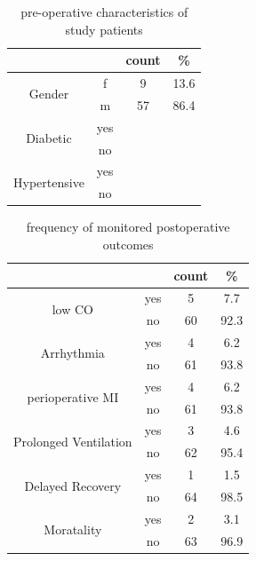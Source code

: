\documentclass[14pt,a4paper,onecolumn]{extarticle}
\begin{document}
\begin{table}[]
\centering
\caption{pre-operative characteristics of study patients}
\label{Preop_characteristics}
    \begin{tabular}{cccc}
    \hline
                                           &     & count & \%   \\ \hline

    \multirow{2}{*}{Gender}                & f   & 9     & 13.6 \\
                                           & m   & 57    & 86.4 \\
    \multirow{2}{*}{Diabetic}              & yes &       &      \\
                                           & no  &       &      \\
    \multirow{2}{*}{Hypertensive}          & yes &       &      \\
                                           & no  &       &      \\

    \end{tabular}
\end{table}

\begin{table}[]
\centering
\caption{frequency of monitored postoperative outcomes}
\label{Postop_outcome}
    \begin{tabular}{cccc}
    \hline
                                           &     & count & \%   \\ \hline

    \multirow{2}{*}{low CO}                & yes & 5     & 7.7  \\
                                           & no  & 60    & 92.3 \\
    \multirow{2}{*}{Arrhythmia}            & yes & 4     & 6.2  \\
                                           & no  & 61    & 93.8 \\
    \multirow{2}{*}{perioperative MI}      & yes & 4     & 6.2  \\
                                           & no  & 61    & 93.8 \\
    \multirow{2}{*}{Prolonged Ventilation} & yes & 3     & 4.6  \\
                                           & no  & 62    & 95.4 \\
    \multirow{2}{*}{Delayed Recovery}      & yes & 1     & 1.5  \\
                                           & no  & 64    & 98.5 \\
    \multirow{2}{*}{Moratality}            & yes & 2     & 3.1  \\
                                           & no  & 63    & 96.9 \\
    \end{tabular}
\end{table}
\end{document}
